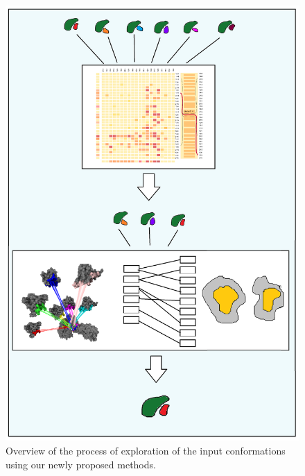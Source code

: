 \documentclass[journal]{vgtc}                %
\begin{document}
\begin{figure}[bt]
  \centering
  \includegraphics[width=1.0\columnwidth]{workflow.png}
  \caption{Overview of the process of exploration of the input conformations using our newly proposed methods.}
  \label{fig:workflow}
\end{figure}
\end{document}
